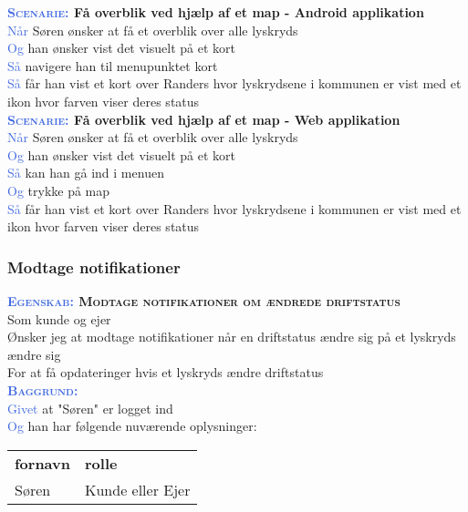 \textbf{\textsc{\textcolor{RoyalBlue}{Scenarie:}} Få overblik ved hjælp af et map - Android applikation}\\
\textcolor{RoyalBlue}{Når} Søren ønsker at få et overblik over alle lyskryds\\
\textcolor{RoyalBlue}{Og} han ønsker vist det visuelt på et kort\\
\textcolor{RoyalBlue}{Så} navigere han til menupunktet kort\\
\textcolor{RoyalBlue}{Så} får han vist et kort over Randers hvor lyskrydsene i kommunen er vist med et ikon hvor farven viser deres status\\

\textbf{\textsc{\textcolor{RoyalBlue}{Scenarie:}} Få overblik ved hjælp af et map - Web applikation}\\
\textcolor{RoyalBlue}{Når} Søren ønsker at få et overblik over alle lyskryds\\
\textcolor{RoyalBlue}{Og} han ønsker vist det visuelt på et kort\\
\textcolor{RoyalBlue}{Så} kan han gå ind i menuen\\
\textcolor{RoyalBlue}{Og} trykke på map\\
\textcolor{RoyalBlue}{Så} får han vist et kort over Randers hvor lyskrydsene i kommunen er vist med et ikon hvor farven viser deres status\\

\subsubsection{Modtage notifikationer}
\textbf{\textsc{\textcolor{RoyalBlue}{Egenskab:} Modtage notifikationer om ændrede driftstatus}}\\
Som kunde og ejer\\
Ønsker jeg at modtage notifikationer når en driftstatus ændre sig på et lyskryds ændre sig\\
For at få opdateringer hvis et lyskryds ændre driftstatus\\

\textsc{\textcolor{RoyalBlue}{\textbf{Baggrund:}}}\\
\textcolor{RoyalBlue}{Givet} at "Søren" er logget ind\\
\textcolor{RoyalBlue}{Og} han har følgende nuværende oplysninger:\\
\begin{tabular}{| l | l |}
	\textbf{fornavn} & \textbf{rolle} \\
	Søren & Kunde eller Ejer\\
\end{tabular}
\newline \newline

